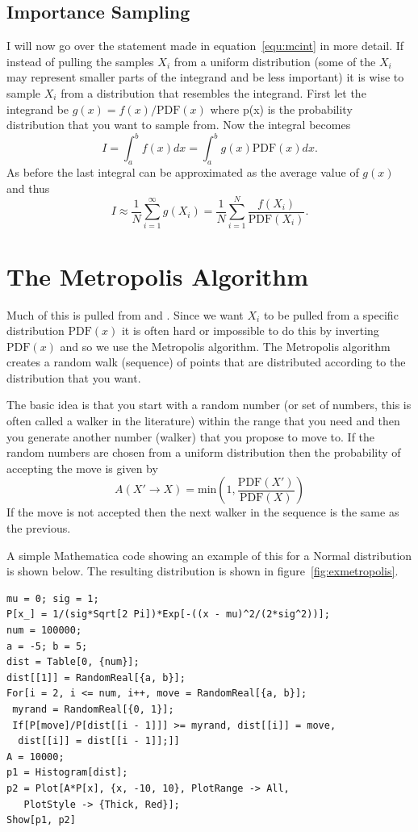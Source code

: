 \documentclass[12pt]{extarticle}
\newcommand{\PDF}{\mathrm{PDF}}
\begin{document}
\subsection{Importance Sampling}
I will now go over the statement made in equation~\ref{equ:mcint} in more detail. If instead of pulling the samples $X_i$ from a uniform distribution (some of the $X_i$ may represent smaller parts of the integrand and be less important) it is wise to sample $X_i$ from a distribution that resembles the integrand. First let the integrand be $g(x) = f(x)/\PDF(x)$ where p(x) is the probability distribution that you want to sample from. Now the integral becomes
\begin{equation}
  I = \int_a^b f(x) dx = \int_a^b g(x) \PDF(x) dx.
\end{equation}
As before the last integral can be approximated as the average value of $g(x)$ and thus
\begin{equation}
  I \approx \frac{1}{N} \sum_{i=1}^\infty g(X_i) = \frac{1}{N} \sum_{i=1}^N \frac{f(X_i)}{\PDF(X_i)}.
\end{equation}

\section{The Metropolis Algorithm}
Much of this is pulled from \cite{kent1999} and \cite{foulkes2001}. Since we want $X_i$ to be pulled from a specific distribution $\PDF(x)$ it is often hard or impossible to do this by inverting $\PDF(x)$ and so we use the Metropolis algorithm. The Metropolis algorithm creates a random walk (sequence) of points that are distributed according to the distribution that you want.

The basic idea is that you start with a random number (or set of numbers, this is often called a walker in the literature) within the range that you need and then you generate another number (walker) that you propose to move to. If the random numbers are chosen from a uniform distribution then the probability of accepting the move is given by
\begin{equation}
  A(X' \rightarrow X) = \mathrm{min}\left( 1,\frac{\PDF(X')}{\PDF(X)} \right)
\end{equation}
If the move is not accepted then the next walker in the sequence is the same as the previous.

A simple Mathematica code showing an example of this for a Normal distribution is shown below. The resulting distribution is shown in figure~\ref{fig:exmetropolis}.
\begin{verbatim}
mu = 0; sig = 1;
P[x_] = 1/(sig*Sqrt[2 Pi])*Exp[-((x - mu)^2/(2*sig^2))];
num = 100000;
a = -5; b = 5;
dist = Table[0, {num}];
dist[[1]] = RandomReal[{a, b}];
For[i = 2, i <= num, i++, move = RandomReal[{a, b}];
 myrand = RandomReal[{0, 1}];
 If[P[move]/P[dist[[i - 1]]] >= myrand, dist[[i]] = move, 
  dist[[i]] = dist[[i - 1]];]]
A = 10000;
p1 = Histogram[dist];
p2 = Plot[A*P[x], {x, -10, 10}, PlotRange -> All, 
   PlotStyle -> {Thick, Red}];
Show[p1, p2]
\end{verbatim}
\end{document}
